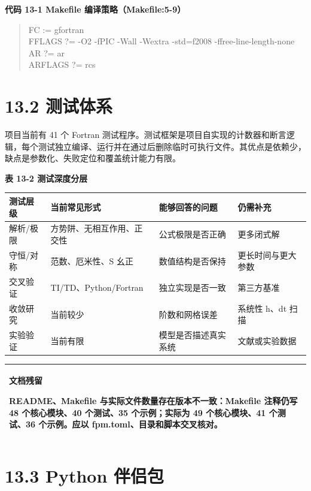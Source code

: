 \documentclass[UTF8,openany,11pt,fontset=fandol]{ctexbook}
\begin{document}
\textbf{代码 13-1 Makefile 编译策略（Makefile:5-9）}

\begin{quote}
FC := gfortran\\
FFLAGS ?= -O2 -fPIC -Wall -Wextra -std=f2008 -ffree-line-length-none\\
AR ?= ar\\
ARFLAGS ?= rcs
\end{quote}

\section{\texorpdfstring{\textbf{13.2
测试体系}}{13.2 测试体系}}\label{ux6d4bux8bd5ux4f53ux7cfb}

项目当前有 41 个 Fortran
测试程序。测试框架是项目自实现的计数器和断言逻辑，每个测试独立编译、运行并在通过后删除临时可执行文件。其优点是依赖少，缺点是参数化、失败定位和覆盖统计能力有限。

\textbf{表 13-2 测试深度分层}

\begin{longtable}[]{@{}llll@{}}
\toprule
\textbf{测试层级} & \textbf{当前常见形式} & \textbf{能够回答的问题} &
\textbf{仍需补充}\tabularnewline
\midrule
\endhead
解析/极限 & 方势阱、无相互作用、正交性 & 公式极限是否正确 &
更多闭式解\tabularnewline
守恒/对称 & 范数、厄米性、S 幺正 & 数值结构是否保持 &
更长时间与更大参数\tabularnewline
交叉验证 & TI/TD、Python/Fortran & 独立实现是否一致 &
第三方基准\tabularnewline
收敛研究 & 当前较少 & 阶数和网格误差 & 系统性 h、dt 扫描\tabularnewline
实验验证 & 当前有限 & 模型是否描述真实系统 &
文献或实验数据\tabularnewline
\bottomrule
\end{longtable}

\begin{longtable}[]{@{}l@{}}
\toprule
\endhead
\begin{minipage}[t]{0.97\columnwidth}\raggedright
\textbf{文档残留}

README、Makefile 与实际文件数量存在版本不一致：Makefile 注释仍写 48
个核心模块、40 个测试、35 个示例；实际为 49 个核心模块、41 个测试、36
个示例。应以 fpm.toml、目录和脚本交叉核对。\strut
\end{minipage}\tabularnewline
\bottomrule
\end{longtable}

\section{\texorpdfstring{\textbf{13.3 Python
伴侣包}}{13.3 Python 伴侣包}}\label{python-ux4f34ux4fa3ux5305}
\end{document}
